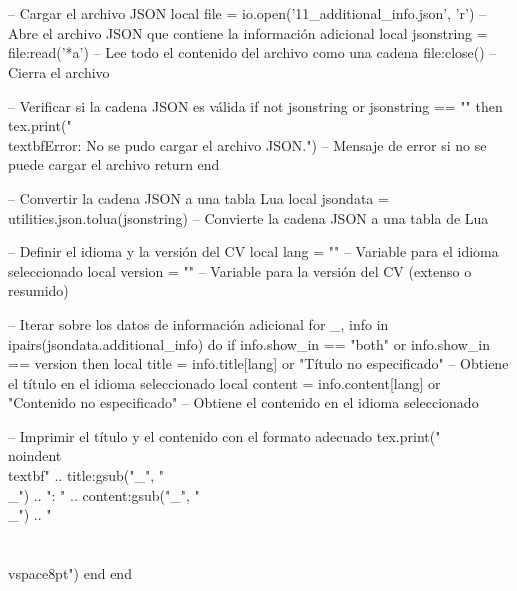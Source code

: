 \section*{\additionalInfoTitle} %
\vspace{-20pt}
\noindent\makebox[\linewidth]{\rule{\textwidth}{0.4pt}} %
\vspace{-10pt}

\setlength{\leftskip}{0pt} %
\setlength{\rightskip}{0pt plus 1fil} %
\raggedright %

\begin{luacode}
-- Cargar el archivo JSON
local file = io.open('11_additional_info.json', 'r') -- Abre el archivo JSON que contiene la información adicional
local jsonstring = file:read('*a') -- Lee todo el contenido del archivo como una cadena
file:close() -- Cierra el archivo

-- Verificar si la cadena JSON es válida
if not jsonstring or jsonstring == "" then
    tex.print("\\textbf{Error: No se pudo cargar el archivo JSON.}") -- Mensaje de error si no se puede cargar el archivo
    return
end

-- Convertir la cadena JSON a una tabla Lua
local jsondata = utilities.json.tolua(jsonstring) -- Convierte la cadena JSON a una tabla de Lua

-- Definir el idioma y la versión del CV
local lang = "\cvLang" -- Variable para el idioma seleccionado
local version = "\cvVersion" -- Variable para la versión del CV (extenso o resumido)

-- Iterar sobre los datos de información adicional
for _, info in ipairs(jsondata.additional_info) do
    if info.show_in == "both" or info.show_in == version then
        local title = info.title[lang] or "Título no especificado" -- Obtiene el título en el idioma seleccionado
        local content = info.content[lang] or "Contenido no especificado" -- Obtiene el contenido en el idioma seleccionado

        -- Imprimir el título y el contenido con el formato adecuado
        tex.print("\\noindent\\textbf{" .. title:gsub("_", "\\_") .. "}: " .. content:gsub("_", "\\_") .. " \\\\ \\vspace{8pt}")
    end
end
\end{luacode}
